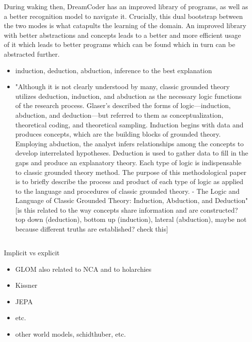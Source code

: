During waking then, DreamCoder has an improved library of programs, as well as a better recognition model to navigate it. Crucially, this dual bootstrap between the two modes is what catapults the learning of the domain. An improved library with better abstractions and concepts leads to a better and more efficient usage of it which leads to better programs which can be found which in turn can be abstracted further. 


\begin{itemize}
    \item induction, deduction, abduction, inference to the best explanation
    \item "Although it is not clearly understood by many, classic grounded theory utilizes deduction, induction, and abduction as the necessary logic functions of the research process. Glaser’s described the forms of logic—induction, abduction, and deduction—but referred to them as conceptualization, theoretical coding, and theoretical sampling. Induction begins with data and produces concepts, which are the building blocks of grounded theory. Employing abduction, the analyst infers relationships among the concepts to develop interrelated hypotheses. Deduction is used to gather data to fill in the gaps and produce an explanatory theory. Each type of logic is indispensable to classic grounded theory method. The purpose of this methodological paper is to briefly describe the process and product of each type of logic as applied to the language and procedures of classic grounded theory. - The Logic and Language of Classic Grounded Theory: Induction, Abduction, and Deduction" [is this related to the way concepts share information and are constructed? top down (deduction), bottom up (induction), lateral (abduction), maybe not because different truths are established? check this]
\end{itemize}









\subsection{}
Implicit vs explicit
\begin{itemize}
    \item GLOM also related to NCA and to holarchies
    \item Kissner
    \item JEPA
    \item etc. 
    \item other world models, schidthuber, etc.
\end{itemize}















